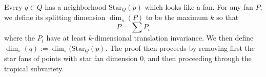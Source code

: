 

    Every $q\in Q$ has a neighborhood $\text{Star}_Q(p)$ which looks like a fan. For any fan $P$, we define its splitting dimension $\dim_s(P)$ to be the maximum $k$ so that 
    \[P=\sum P_i\]
    where the $P_i$ have at least $k$-dimensional translation invariance. We then define $\dim_s(q):= \dim_s(\text{Star}_Q(p)$. 
    The proof then proceeds by removing first the star fans of points with star fan dimension 0, and then proceeding through the tropical subvariety. 

